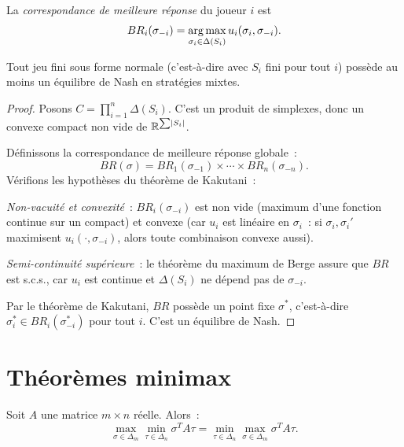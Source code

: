 \begin{definition}
La \emph{correspondance de meilleure r\'eponse} du joueur $i$ est
\[
  BR_i(\sigma_{-i}) = \operatorname*{arg\,max}_{\sigma_i \in \Delta(S_i)} u_i(\sigma_i, \sigma_{-i}).
\]
\end{definition}

\begin{theoreme}[Nash, 1950]
\label{thm:nash}
Tout jeu fini sous forme normale (c'est-\`a-dire avec $S_i$ fini pour tout $i$) poss\`ede
au moins un \'equilibre de Nash en strat\'egies mixtes.
\end{theoreme}

\begin{proof}
Posons $C = \prod_{i=1}^n \Delta(S_i)$. C'est un produit de simplexes, donc un convexe
compact non vide de $\mathbb{R}^{\sum \left| S_i \right|}$.

D\'efinissons la correspondance de meilleure r\'eponse globale~:
\[
  BR(\sigma) = BR_1(\sigma_{-1}) \times \cdots \times BR_n(\sigma_{-n}).
\]
V\'erifions les hypoth\`eses du th\'eor\`eme de Kakutani~:

\emph{Non-vacuit\'e et convexit\'e}~: $BR_i(\sigma_{-i})$ est non vide (maximum d'une
fonction continue sur un compact) et convexe (car $u_i$ est lin\'eaire en $\sigma_i$~:
si $\sigma_i, \sigma_i'$ maximisent $u_i(\cdot, \sigma_{-i})$, alors toute combinaison
convexe aussi).

\emph{Semi-continuit\'e sup\'erieure}~: le th\'eor\`eme du maximum de Berge assure que
$BR$ est s.c.s., car $u_i$ est continue et $\Delta(S_i)$ ne d\'epend pas de $\sigma_{-i}$.

Par le th\'eor\`eme de Kakutani, $BR$ poss\`ede un point fixe $\sigma^*$, c'est-\`a-dire
$\sigma_i^* \in BR_i(\sigma_{-i}^*)$ pour tout $i$. C'est un \'equilibre de Nash.
\end{proof}

\section{Th\'eor\`emes minimax}

\begin{theoreme}
\label{thm:minimax}
Soit $A$ une matrice $m \times n$ r\'eelle. Alors~:
\[
  \max_{\sigma \in \Delta_m} \min_{\tau \in \Delta_n} \sigma^T A \tau
  = \min_{\tau \in \Delta_n} \max_{\sigma \in \Delta_m} \sigma^T A \tau.
\]
\end{theoreme}

